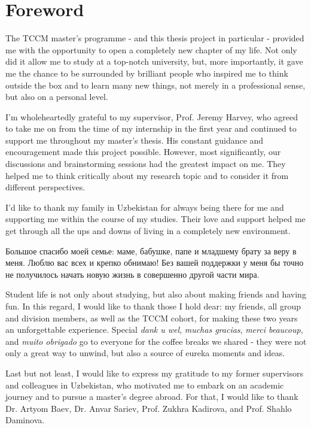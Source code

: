 \chapter*{Foreword}  

The TCCM master's programme - and this thesis project in particular - provided me with the opportunity to open a completely new chapter of my life. Not only did it allow me to study at a top-notch university, but, more importantly, it gave me the chance to be surrounded by brilliant people who inspired me to think outside the box and to learn many new things, not merely in a professional sense, but also on a personal level.

\par\smallskip
I'm wholeheartedly grateful to my supervisor, Prof. Jeremy Harvey, who agreed to take me on from the time of my internship in the first year and continued to support me throughout my master's thesis. His constant guidance and encouragement made this project possible. However, most significantly, our discussions and brainstorming sessions had the greatest impact on me. They helped me to think critically about my research topic and to consider it from different perspectives.

\par\smallskip
I'd like to thank my family in Uzbekistan for always being there for me and supporting me within the course of my studies. Their love and support helped me get through all the ups and downs of living in a completely new environment. \begin{otherlanguage}{russian} Большое спасибо моей семье: маме, бабушке, папе и младшему брату за веру в меня. Люблю вас всех и крепко обнимаю! Без вашей поддержки у меня бы точно не получилось начать новую жизнь в совершенно другой части мира. \end{otherlanguage}

\par\smallskip
Student life is not only about studying, but also about making friends and having fun. In this regard, I would like to thank those I hold dear: my friends, all group and division members, as well as the TCCM cohort, for making these two years an unforgettable experience. Special \textit{dank u wel}, \textit{muchas gracias}, \textit{merci beaucoup}, and \textit{muito obrigado} go to everyone for the coffee breaks we shared - they were not only a great way to unwind, but also a source of eureka moments and ideas.

\par\smallskip
Last but not least, I would like to express my gratitude to my former supervisors and colleagues in Uzbekistan, who motivated me to embark on an academic journey and to pursue a master's degree abroad. For that, I would like to thank Dr. Artyom Baev, Dr. Anvar Sariev, Prof. Zukhra Kadirova, and Prof. Shahlo Daminova. 

